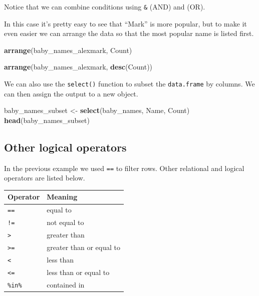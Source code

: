 \documentclass[]{book}
\newenvironment{Shaded}{\begin{snugshade}}{\end{snugshade}}
\newcommand{\KeywordTok}[1]{\textcolor[rgb]{0.13,0.29,0.53}{\textbf{#1}}}
\newcommand{\StringTok}[1]{\textcolor[rgb]{0.31,0.60,0.02}{#1}}
\newcommand{\NormalTok}[1]{#1}
\begin{document}
Notice that we can combine conditions using \texttt{\&} (AND) and
\texttt{\textbar{}} (OR).

In this case it's pretty easy to see that ``Mark'' is more popular, but
to make it even easier we can arrange the data so that the most popular
name is listed first.

\begin{Shaded}
\begin{Highlighting}[]
\KeywordTok{arrange}\NormalTok{(baby_names_alexmark, Count)}
\end{Highlighting}
\end{Shaded}

\begin{Shaded}
\begin{Highlighting}[]
\KeywordTok{arrange}\NormalTok{(baby_names_alexmark, }\KeywordTok{desc}\NormalTok{(Count))}
\end{Highlighting}
\end{Shaded}

We can also use the \texttt{select()} function to subset the
\texttt{data.frame} by columns. We can then assign the output to a new
object.

\begin{Shaded}
\begin{Highlighting}[]
\NormalTok{baby_names_subset <-}\StringTok{ }\KeywordTok{select}\NormalTok{(baby_names, Name, Count)}
\KeywordTok{head}\NormalTok{(baby_names_subset)}
\end{Highlighting}
\end{Shaded}

\subsection{Other logical operators}\label{other-logical-operators}

In the previous example we used \texttt{==} to filter rows. Other
relational and logical operators are listed below.

\begin{longtable}[]{@{}ll@{}}
\toprule
Operator & Meaning\tabularnewline
\midrule
\endhead
\texttt{==} & equal to\tabularnewline
\texttt{!=} & not equal to\tabularnewline
\texttt{\textgreater{}} & greater than\tabularnewline
\texttt{\textgreater{}=} & greater than or equal to\tabularnewline
\texttt{\textless{}} & less than\tabularnewline
\texttt{\textless{}=} & less than or equal to\tabularnewline
\texttt{\%in\%} & contained in\tabularnewline
\bottomrule
\end{longtable}
\end{document}
